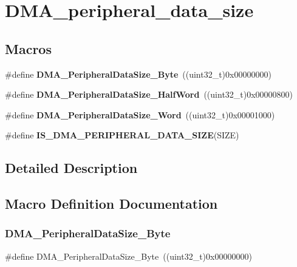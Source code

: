 \section{D\+M\+A\+\_\+peripheral\+\_\+data\+\_\+size}
\label{group__DMA__peripheral__data__size}
\subsection*{Macros}
\begin{DoxyCompactItemize}
\item 
\#define \textbf{ D\+M\+A\+\_\+\+Peripheral\+Data\+Size\+\_\+\+Byte}~((uint32\+\_\+t)0x00000000)
\item 
\#define \textbf{ D\+M\+A\+\_\+\+Peripheral\+Data\+Size\+\_\+\+Half\+Word}~((uint32\+\_\+t)0x00000800)
\item 
\#define \textbf{ D\+M\+A\+\_\+\+Peripheral\+Data\+Size\+\_\+\+Word}~((uint32\+\_\+t)0x00001000)
\item 
\#define \textbf{ I\+S\+\_\+\+D\+M\+A\+\_\+\+P\+E\+R\+I\+P\+H\+E\+R\+A\+L\+\_\+\+D\+A\+T\+A\+\_\+\+S\+I\+ZE}(S\+I\+ZE)
\end{DoxyCompactItemize}


\subsection{Detailed Description}


\subsection{Macro Definition Documentation}
\mbox{\label{group__DMA__peripheral__data__size_ga7577035ae4ff413164000227a8cea346}} 
\subsubsection{D\+M\+A\+\_\+\+Peripheral\+Data\+Size\+\_\+\+Byte}
{\footnotesize\ttfamily \#define D\+M\+A\+\_\+\+Peripheral\+Data\+Size\+\_\+\+Byte~((uint32\+\_\+t)0x00000000)}



